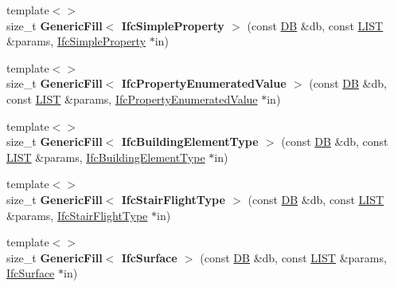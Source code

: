 \begin{DoxyCompactItemize}
\item 
\hypertarget{namespace_assimp_1_1_s_t_e_p_a0a6f8f6132215b941212707aa50ff2e1}{{\footnotesize template$<$$>$ }\\size\+\_\+t {\bfseries Generic\+Fill$<$ Ifc\+Simple\+Property $>$} (const \hyperlink{class_assimp_1_1_s_t_e_p_1_1_d_b}{D\+B} \&db, const \hyperlink{class_assimp_1_1_s_t_e_p_1_1_e_x_p_r_e_s_s_1_1_l_i_s_t}{L\+I\+S\+T} \&params, \hyperlink{struct_assimp_1_1_i_f_c_1_1_ifc_simple_property}{Ifc\+Simple\+Property} $\ast$in)}\label{namespace_assimp_1_1_s_t_e_p_a0a6f8f6132215b941212707aa50ff2e1}

\item 
\hypertarget{namespace_assimp_1_1_s_t_e_p_a5e6fcdb5e7af64b1e06ba63e719e3606}{{\footnotesize template$<$$>$ }\\size\+\_\+t {\bfseries Generic\+Fill$<$ Ifc\+Property\+Enumerated\+Value $>$} (const \hyperlink{class_assimp_1_1_s_t_e_p_1_1_d_b}{D\+B} \&db, const \hyperlink{class_assimp_1_1_s_t_e_p_1_1_e_x_p_r_e_s_s_1_1_l_i_s_t}{L\+I\+S\+T} \&params, \hyperlink{struct_assimp_1_1_i_f_c_1_1_ifc_property_enumerated_value}{Ifc\+Property\+Enumerated\+Value} $\ast$in)}\label{namespace_assimp_1_1_s_t_e_p_a5e6fcdb5e7af64b1e06ba63e719e3606}

\item 
\hypertarget{namespace_assimp_1_1_s_t_e_p_a1f1c54b1267728d81f7b99fd87d5748a}{{\footnotesize template$<$$>$ }\\size\+\_\+t {\bfseries Generic\+Fill$<$ Ifc\+Building\+Element\+Type $>$} (const \hyperlink{class_assimp_1_1_s_t_e_p_1_1_d_b}{D\+B} \&db, const \hyperlink{class_assimp_1_1_s_t_e_p_1_1_e_x_p_r_e_s_s_1_1_l_i_s_t}{L\+I\+S\+T} \&params, \hyperlink{struct_assimp_1_1_i_f_c_1_1_ifc_building_element_type}{Ifc\+Building\+Element\+Type} $\ast$in)}\label{namespace_assimp_1_1_s_t_e_p_a1f1c54b1267728d81f7b99fd87d5748a}

\item 
\hypertarget{namespace_assimp_1_1_s_t_e_p_ae8c609e821cacdcdcb5c0deb5437f607}{{\footnotesize template$<$$>$ }\\size\+\_\+t {\bfseries Generic\+Fill$<$ Ifc\+Stair\+Flight\+Type $>$} (const \hyperlink{class_assimp_1_1_s_t_e_p_1_1_d_b}{D\+B} \&db, const \hyperlink{class_assimp_1_1_s_t_e_p_1_1_e_x_p_r_e_s_s_1_1_l_i_s_t}{L\+I\+S\+T} \&params, \hyperlink{struct_assimp_1_1_i_f_c_1_1_ifc_stair_flight_type}{Ifc\+Stair\+Flight\+Type} $\ast$in)}\label{namespace_assimp_1_1_s_t_e_p_ae8c609e821cacdcdcb5c0deb5437f607}

\item 
\hypertarget{namespace_assimp_1_1_s_t_e_p_adb59b3caae6ab7870b75fbb2fd3d23ad}{{\footnotesize template$<$$>$ }\\size\+\_\+t {\bfseries Generic\+Fill$<$ Ifc\+Surface $>$} (const \hyperlink{class_assimp_1_1_s_t_e_p_1_1_d_b}{D\+B} \&db, const \hyperlink{class_assimp_1_1_s_t_e_p_1_1_e_x_p_r_e_s_s_1_1_l_i_s_t}{L\+I\+S\+T} \&params, \hyperlink{struct_assimp_1_1_i_f_c_1_1_ifc_surface}{Ifc\+Surface} $\ast$in)}\label{namespace_assimp_1_1_s_t_e_p_adb59b3caae6ab7870b75fbb2fd3d23ad}


\end{DoxyCompactItemize}
